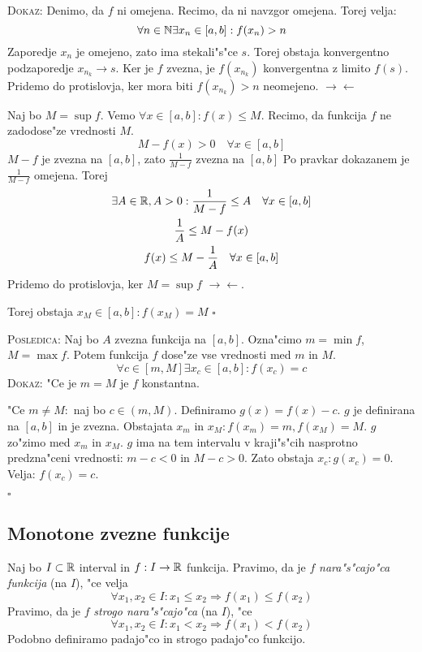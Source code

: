 \textsc{Dokaz:} Denimo, da $f$ ni omejena. Recimo, da ni navzgor omejena. Torej velja:
\begin{equation*}
\forall n \in \mathbb{N} \exists x_n \in [a, b]: f(x_n) > n
\end{equation*}
Zaporedje $x_n$ je omejeno, zato ima stekali"s"ce $s$. Torej obstaja konvergentno podzaporedje $x_{n_k} \to s$. Ker je $f$ zvezna, je $f(x_{n_k})$ konvergentna z limito $f(s)$. Pridemo do protislovja, ker mora biti $f(x_{n_k}) > n$ neomejeno. $\rightarrow \leftarrow$

Naj bo $M = \sup f$. Vemo $\forall x \in [a, b]: f(x) \leq M$. Recimo, da funkcija $f$ ne zadodose"ze vrednosti $M$.
\begin{equation*}
M - f(x) > 0 \quad \forall x \in [a, b]
\end{equation*}
$M-f$ je zvezna na $[a, b]$, zato $\frac{1}{M-f}$ zvezna na $[a, b]$ Po pravkar dokazanem je $\frac{1}{M-f}$ omejena. Torej
\begin{gather*}
\exists A \in \mathbb{R}, A > 0: \dfrac{1}{M-f} \leq A \quad \forall x \in [a, b] \\
\dfrac{1}{A} \leq M - f(x) \\
f(x) \leq M - \dfrac{1}{A} \quad \forall x \in [a, b]
\end{gather*}
Pridemo do protislovja, ker $M = \sup f$ $\rightarrow \leftarrow$.

Torej obstaja $x_M \in [a ,b]: f(x_M) = M$ \hfill $\square$

\textsc{Posledica:} Naj bo $A$ zvezna funkcija na $[a, b]$. Ozna"cimo $m = \min f$, $M = \max f$. Potem funkcija $f$ dose"ze vse vrednosti med $m$ in $M$.
\begin{equation*}
\forall c \in [m, M] \exists x_c \in [a, b]: f(x_c) = c
\end{equation*}
\textsc{Dokaz:} "Ce je $m = M$ je $f$ konstantna.

"Ce $m \neq M:$ naj bo $c \in (m, M)$. Definiramo $g(x) = f(x) - c$. $g$ je definirana na $[a, b]$ in je zvezna. Obstajata $x_m$ in $x_M: f(x_m) = m, f(x_M) = M$. $g$ zo"zimo med $x_m$ in $x_M$. $g$ ima na tem intervalu v kraji"s"cih nasprotno predzna"ceni vrednosti: $m-c < 0$ in $M-c > 0$. Zato obstaja $x_c: g(x_c) = 0$. Velja: $f(x_c) = c$.

\hfill $\square$
%
\subsection{Monotone zvezne funkcije}
 Naj bo $I \subset \mathbb{R}$ interval in $f: I \to \mathbb{R}$ funkcija. Pravimo, da je $f$ \emph{nara"s"cajo"ca funkcija} (na $I$), "ce velja
\begin{equation*}
\forall x_1, x_2 \in I: x_1 \leq x_2 \Rightarrow f(x_1) \leq f(x_2)
\end{equation*}
Pravimo, da je $f$ \emph{strogo nara"s"cajo"ca} (na $I$), "ce
\begin{equation*}
\forall x_1, x_2 \in I : x_1 < x_2 \Rightarrow f(x_1) < f(x_2)
\end{equation*}
Podobno definiramo padajo"co in strogo padajo"co funkcijo.


